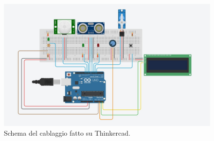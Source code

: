 \documentclass[a4paper,12pt]{report}
\begin{document}
\begin{figure}[H]
\centering
\includegraphics[width=\textwidth]{img/wirings.jpg}
\caption{Schema del cablaggio fatto su Thinkercad.}
\label{fig:wirings}
\end{figure}
\end{document}

